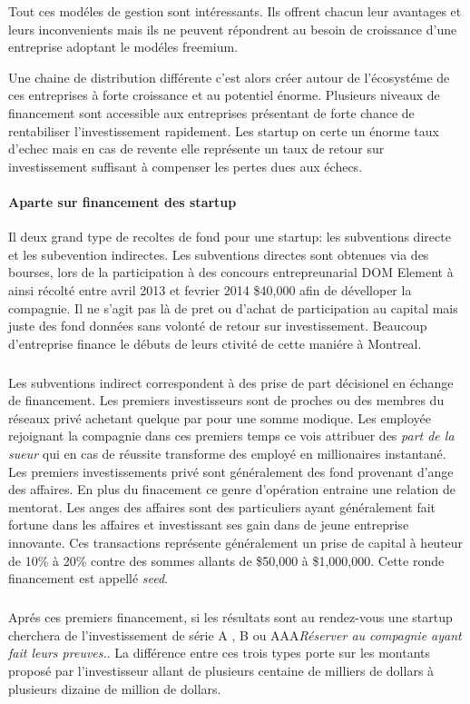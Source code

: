 \documentclass[11pt, a4paper ]{article}
\begin{document}
\begin{spacing}{1.5}
Tout ces modéles de gestion sont intéressants. Ils offrent chacun leur avantages et leurs inconvenients mais ils ne peuvent répondrent au besoin de croissance d'une entreprise adoptant le modéles freemium.

Une chaine de distribution différente c'est alors créer autour de l'écosystéme de ces entreprises à forte croissance et au potentiel énorme. Plusieurs niveaux de financement sont accessible aux entreprises présentant de forte chance de rentabiliser l'investissement rapidement. Les startup on certe un énorme taux d'echec mais en cas de revente elle représente un taux de retour sur investissement suffisant à compenser les pertes dues aux échecs.

		\paragraph{Aparte sur financement des startup}

Il deux grand type de recoltes de fond pour une startup: les subventions directe et les subevention indirectes.
Les subventions directes sont obtenues via des bourses, lors de la participation à des concours entrepreunarial DOM Element à ainsi récolté entre avril 2013 et fevrier 2014 \$40,000 afin de dévelloper la compagnie. Il ne s'agit pas là de pret ou d'achat de participation au capital mais juste des fond données sans volonté de retour sur investissement. Beaucoup d'entreprise finance le débuts de leurs ctivité de cette maniére à Montreal.

\subparagraph{}
Les subventions indirect correspondent à des prise de part décisionel en échange de financement. Les premiers investisseurs sont de proches ou des membres du réseaux privé achetant quelque par pour une somme modique. Les employée rejoignant la compagnie dans ces premiers temps ce vois attribuer des \emph{part de la sueur} qui en cas de réussite transforme des employé en millionaires instantané.
Les premiers investissements privé sont généralement des fond provenant d'ange des affaires. En plus du finacement ce genre d'opération entraine une relation de mentorat. Les anges des affaires sont des particuliers ayant généralement fait fortune dans les affaires et investissant ses gain dans de jeune entreprise innovante. Ces transactions représente généralement un prise de capital à heuteur de 10\% à 20\% contre des sommes allants de \$50,000 à \$1,000,000. Cette ronde financement est appellé \emph{seed}.

\subparagraph{}
Aprés ces premiers financement, si les résultats sont au rendez-vous une startup cherchera de l'investissement de série A , B ou AAA\emph{Réserver au compagnie ayant fait leurs preuves.}. La différence entre ces trois types porte sur les montants proposé par l'investisseur allant de plusieurs centaine de milliers de dollars à plusieurs dizaine de million de dollars.


\end{spacing}
\end{document}
